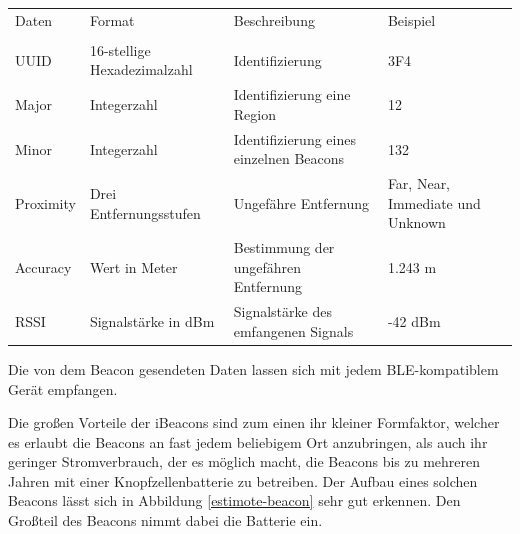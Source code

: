 \begin{tabular}{p{2cm}p{5cm}p{5cm}p{4cm}}
	\\
	Daten & Format & Beschreibung & Beispiel \\ \\
	UUID & 16-stellige Hexadezimalzahl & Identifizierung & 3F4 \\
	Major & Integerzahl & Identifizierung eine Region & 12 \\
	Minor & Integerzahl & Identifizierung eines einzelnen Beacons & 132 \\
	Proximity & Drei Entfernungsstufen & Ungefähre Entfernung & Far, Near, Immediate und Unknown \\
	Accuracy & Wert in Meter & Bestimmung der ungefähren Entfernung & 1.243 m \\
	RSSI & Signalstärke in dBm & Signalstärke des emfangenen Signals & -42 dBm \\
\end{tabular}


Die von dem Beacon gesendeten Daten lassen sich mit jedem BLE-kompatiblem Gerät empfangen.



Die großen Vorteile der iBeacons sind zum einen ihr kleiner Formfaktor, welcher es erlaubt die Beacons an fast jedem beliebigem Ort anzubringen, als auch ihr geringer Stromverbrauch, der es möglich macht, die Beacons bis zu mehreren Jahren mit einer Knopfzellenbatterie zu betreiben. Der Aufbau eines solchen Beacons lässt sich in Abbildung \ref{estimote-beacon} sehr gut erkennen. Den Großteil des Beacons nimmt dabei die Batterie ein. 


